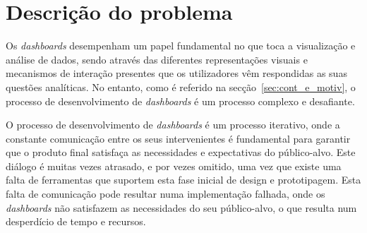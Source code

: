 \section{Descrição do problema}
\label{sec:des_problema}

Os \textit{dashboards} desempenham um papel fundamental no que toca a visualização e análise de dados, sendo através das diferentes representações visuais e mecanismos de interação presentes que os utilizadores vêm respondidas as suas questões analíticas. No entanto, como é referido na secção~\ref{sec:cont_e_motiv}, o processo de desenvolvimento de \textit{dashboards} é um processo complexo e desafiante. %
\begin{comment}
\begin{itemize}
    \item Conhecer o público-alvo;
    \item Definir o propósito e os objetivos;
    \item Selecionar e preparar os dados relevantes;
    \item Focar na clareza e eficácia da comunicação;
\end{itemize}
\end{comment}

O processo de desenvolvimento de \textit{dashboards} é um processo iterativo, onde a constante comunicação entre os seus intervenientes é fundamental para garantir que o produto final satisfaça as necessidades e expectativas do público-alvo. Este diálogo é muitas vezes atrasado, e por vezes omitido, uma vez que existe uma falta de ferramentas que suportem esta fase inicial de design e prototipagem. Esta falta de comunicação pode resultar numa implementação falhada, onde os \textit{dashboards} não satisfazem as necessidades do seu público-alvo, o que resulta num desperdício de tempo e recursos.

